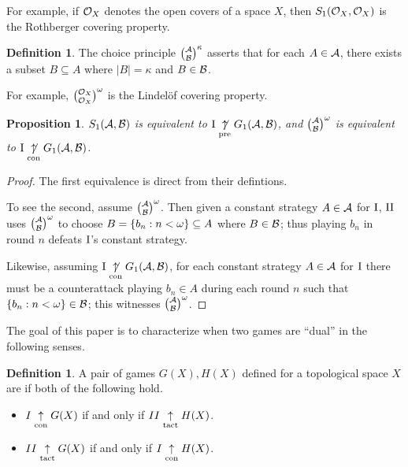 \documentclass{amsart}
\theoremstyle{plain}
\newtheorem{proposition}[theorem]{Proposition}
\theoremstyle{definition}
\newtheorem{definition}[theorem]{Definition}
\theoremstyle{remark}
\theoremstyle{plain}
\theoremstyle{definition}
\theoremstyle{remark}
\begin{document}
For example, if \(\mathcal{O}_X\) denotes the open covers of a space \(X\), 
then \(S_{1}(\mathcal{O}_X,\mathcal{O}_X)\) is the Rothberger covering property.

\begin{definition}
  The choice principle \(\binom{\mathcal{A}}{\mathcal{B}}^\kappa\) asserts
  that for each \(A\in \mathcal{A}\), there exists a subset
  \(B\subseteq A\) where \(|B|=\kappa\) and \(B\in\mathcal{B}\).
\end{definition}

For example,
\(\binom{\mathcal{O}_X}{\mathcal{O}_X}^\omega\) is the Lindel\"of covering property.

\begin{proposition}
  \(S_{1}(\mathcal{A},\mathcal{B})\) is equivalent to
  \(\mathrm{I}\underset{\text{pre}}{\not\uparrow} G_{1}(\mathcal{A},\mathcal{B})\), and
  \(\binom{\mathcal{A}}{\mathcal{B}}^\omega\) is equivalent to
  \(\mathrm{I}\underset{\text{con}}{\not\uparrow} G_{1}(\mathcal{A},\mathcal{B})\).
\end{proposition}

\begin{proof}
  The first equivalence is direct from their defintions.

  To see the second,
  assume \(\binom{\mathcal{A}}{\mathcal{B}}^\omega\). Then given a constant strategy
  \(A\in\mathcal{A}\) for \(\mathrm{I}\), \(\mathrm{II}\) uses \(\binom{\mathcal{A}}{\mathcal{B}}^\omega\) to
  choose \(B=\left\{b_n:n<\omega\right\}\subseteq A\) where \(B\in\mathcal{B}\); thus
  playing \(b_n\) in round
  \(n\) defeats \(\mathrm{I}\)'s constant strategy.

  Likewise, assuming 
  \(\mathrm{I}\underset{\text{con}}{\not\uparrow} G_{1}(\mathcal{A},\mathcal{B})\), for each constant strategy
  \(A\in\mathcal{A}\) for \(\mathrm{I}\) there must be a counterattack playing \(b_n\in A\)
  during each round \(n\) such that \(\left\{b_n:n<\omega\right\}\in\mathcal{B}\); this witnesses
  \(\binom{\mathcal{A}}{\mathcal{B}}^\omega\).
\end{proof}

The goal of this paper is to characterize when two games are ``dual'' in the following
senses.

\begin{definition}
  A pair of games \(G(X),H(X)\) defined for a topological space \(X\)
  are  if both
  of the following hold.
  \begin{itemize}
    \item \(I\underset{\text{con}}{\uparrow} G(X)\) if and only if \(II\underset{\text{tact}}{\uparrow} H(X)\).
    \item \(II\underset{\text{tact}}{\uparrow} G(X)\) if and only if \(I\underset{\text{con}}{\uparrow} H(X)\).
  \end{itemize}
\end{definition}
\end{document}
